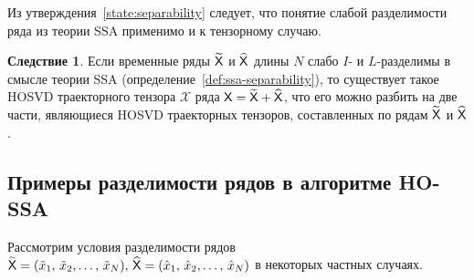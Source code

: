 \documentclass[specialist,
  substylefile=spbu.rtx,
subf,href,colorlinks=true, 12pt]{disser}
\theoremstyle{plain}
\theoremstyle{definition}
\newtheorem*{corollary}{Следствие}
\theoremstyle{remark}
\begin{document}
Из утверждения~\ref{state:separability} следует, что понятие слабой разделимости ряда из теории SSA
применимо и к тензорному случаю.
\begin{corollary}
  Если временные ряды $\widetilde{\mathsf{X}}$ и $\widehat{\mathsf{X}}$ длины $N$ слабо $I$- и $L$-разделимы
  в смысле теории SSA (определение~\ref{def:ssa-separability}),
  то существует такое HOSVD траекторного тензора $\mathcal{X}$ ряда
  $\mathsf{X}=\widetilde{\mathsf{X}} + \widehat{\mathsf{X}}$, что его можно разбить
  на две части, являющиеся HOSVD траекторных тензоров, составленных по рядам
  $\widetilde{\mathsf{X}}$ и $\widehat{\mathsf{X}}$.
\end{corollary}

\subsection{Примеры разделимости рядов в алгоритме HO-SSA}\label{subsec:separation-example}
Рассмотрим условия разделимости рядов $\widetilde{\mathsf{X}}=(\tilde{x}_{1},\, \tilde{x}_{2},\ldots,\, \tilde{x}_{N}),\, \widehat{\mathsf{X}}=
(\hat{x}_{1},\, \hat{x}_{2},\ldots,\, \hat{x}_{N})$ в некоторых частных случаях.
\end{document}
